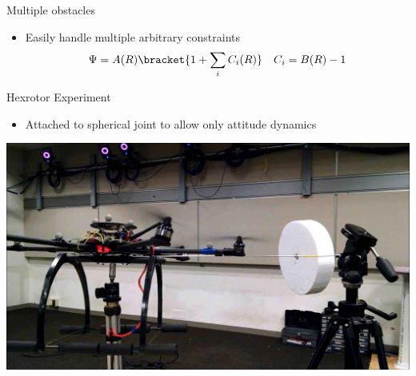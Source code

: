 \begin{frame}{Multiple obstacles}%

\begin{itemize}
    \item Easily handle multiple arbitrary constraints 
    \begin{align*}
        \Psi = A(R) \bracket{1 + \sum_i C_i(R)} \quad C_i = B(R) - 1
    \end{align*}
\end{itemize}

\begin{center}
\end{center}

\end{frame}%

\begin{frame}{Hexrotor Experiment} %
\begin{itemize}
    \item Attached to spherical joint to allow only attitude dynamics
\end{itemize}
\begin{center}
    \href{https://youtu.be/dsmAbwQram4?t=20s}{\includegraphics[height=0.7\textheight]{figures/2016ACC/hexrotor}}
\end{center}
\end{frame}   %
